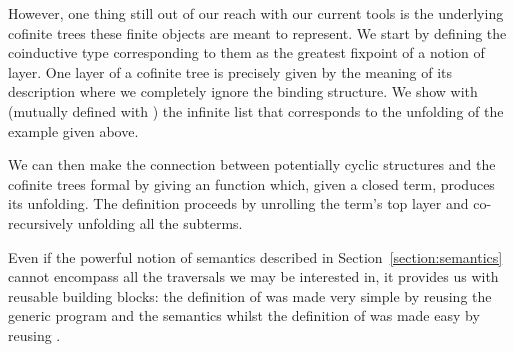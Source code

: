 \begin{minipage}{\textwidth}
\begin{minipage}{0.52\textwidth}
\end{minipage}
\newline
\begin{minipage}{0.43\textwidth}
\end{minipage}
\end{minipage}

However, one thing still out of our reach with our current tools is
the underlying cofinite trees these finite objects are meant to
represent. We start by defining the coinductive type corresponding to
them as the greatest fixpoint of a notion of layer. One layer of a
cofinite tree is precisely given by the meaning of its description
where we completely ignore the binding structure. We show with
 (mutually defined with ) the infinite list that
corresponds to the unfolding of the example  given above.


\begin{minipage}{\textwidth}
  \newline
\begin{minipage}{0.4\textwidth}
\end{minipage}\qquad
\begin{minipage}{0.4\textwidth}
\end{minipage}
\end{minipage}

We can then make the connection between potentially cyclic
structures and the cofinite trees formal by giving an 
function which, given a closed term, produces its unfolding.
The definition proceeds by unrolling the term's top layer and
co-recursively unfolding all the subterms.

\begin{agdasnippet}
\end{agdasnippet}

Even if the
powerful notion of semantics described in Section~\ref{section:semantics}
cannot encompass all the traversals we may be interested in,
it provides us with reusable building blocks: the definition
of  was made very simple by reusing the generic
program  and the  semantics whilst
the definition of  was made easy by reusing .

